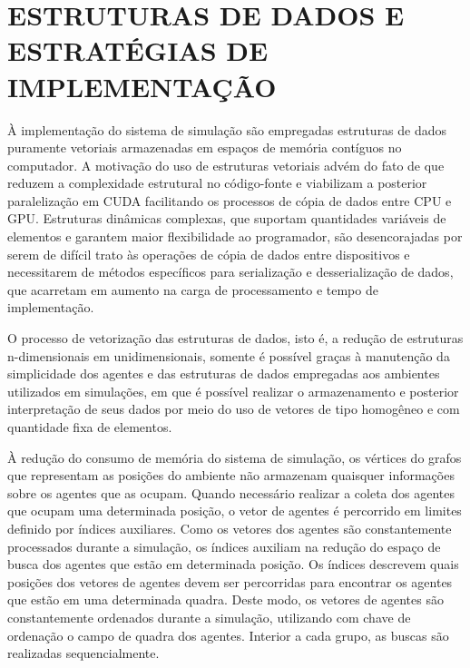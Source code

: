 \section{ESTRUTURAS DE DADOS E ESTRATÉGIAS DE IMPLEMENTAÇÃO}
\label{sec:estruturasDadosEstrategiasImplementacao}

À implementação do sistema de simulação são empregadas estruturas de dados puramente vetoriais armazenadas em espaços de memória contíguos no computador. A motivação do uso de estruturas vetoriais advém do fato de que reduzem a complexidade estrutural no código-fonte e viabilizam a posterior paralelização em CUDA facilitando os processos de cópia de dados entre CPU e GPU. Estruturas dinâmicas complexas, que suportam quantidades variáveis de elementos e garantem maior flexibilidade ao programador, são desencorajadas por serem de difícil trato às operações de cópia de dados entre dispositivos e necessitarem de métodos específicos para serialização e desserialização de dados, que acarretam em aumento na carga de processamento e tempo de implementação. 

O processo de vetorização das estruturas de dados, isto é, a redução de estruturas n-dimensionais em unidimensionais, somente é possível graças à manutenção da simplicidade dos agentes e das estruturas de dados empregadas aos ambientes utilizados em simulações, em que é possível realizar o armazenamento e posterior interpretação de seus dados por meio do uso de vetores de tipo homogêneo e com quantidade fixa de elementos. 

À redução do consumo de memória do sistema de simulação, os vértices do grafos que representam as posições do ambiente não armazenam quaisquer informações sobre os agentes que as ocupam. Quando necessário realizar a coleta dos agentes que ocupam uma determinada posição, o vetor de agentes é percorrido em limites definido por índices auxiliares. Como os vetores dos agentes são constantemente processados durante a simulação, os índices auxiliam na redução do espaço de busca dos agentes que estão em determinada posição. Os índices descrevem quais posições dos vetores de agentes devem ser percorridas para encontrar os agentes que estão em uma determinada quadra. Deste modo, os vetores de agentes são constantemente ordenados durante a simulação, utilizando com chave de ordenação o campo de quadra dos agentes. Interior a cada grupo, as buscas são realizadas sequencialmente.

